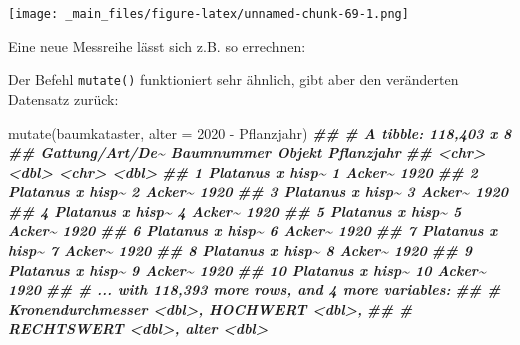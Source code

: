 \documentclass[11pt,german,a4paper]{article}
\newenvironment{Shaded}{\begin{snugshade}}{\end{snugshade}}
\newcommand{\AttributeTok}[1]{\textcolor[rgb]{0.77,0.63,0.00}{#1}}
\newcommand{\DecValTok}[1]{\textcolor[rgb]{0.00,0.00,0.81}{#1}}
\newcommand{\DocumentationTok}[1]{\textcolor[rgb]{0.56,0.35,0.01}{\textbf{\textit{#1}}}}
\newcommand{\FunctionTok}[1]{\textcolor[rgb]{0.00,0.00,0.00}{#1}}
\newcommand{\NormalTok}[1]{#1}
\newcommand{\OtherTok}[1]{\textcolor[rgb]{0.56,0.35,0.01}{#1}}
\newcommand{\SpecialCharTok}[1]{\textcolor[rgb]{0.00,0.00,0.00}{#1}}
\begin{document}
\texttt{[image: \_main\_files/figure-latex/unnamed-chunk-69-1.png]}

Eine neue Messreihe lässt sich z.B. so errechnen:

\begin{Shaded}
\end{Shaded}

Der Befehl \texttt{mutate()} funktioniert sehr ähnlich, gibt aber den veränderten Datensatz zurück:

\begin{Shaded}
\begin{Highlighting}[]
\FunctionTok{mutate}\NormalTok{(baumkataster, }\AttributeTok{alter =} \DecValTok{2020} \SpecialCharTok{{-}}\NormalTok{ Pflanzjahr)}
\DocumentationTok{\#\# \# A tibble: 118,403 x 8}
\DocumentationTok{\#\#    \textasciigrave{}Gattung/Art/De\textasciitilde{} Baumnummer Objekt Pflanzjahr}
\DocumentationTok{\#\#    \textless{}chr\textgreater{}                 \textless{}dbl\textgreater{} \textless{}chr\textgreater{}       \textless{}dbl\textgreater{}}
\DocumentationTok{\#\#  1 Platanus x hisp\textasciitilde{}          1 Acker\textasciitilde{}       1920}
\DocumentationTok{\#\#  2 Platanus x hisp\textasciitilde{}          2 Acker\textasciitilde{}       1920}
\DocumentationTok{\#\#  3 Platanus x hisp\textasciitilde{}          3 Acker\textasciitilde{}       1920}
\DocumentationTok{\#\#  4 Platanus x hisp\textasciitilde{}          4 Acker\textasciitilde{}       1920}
\DocumentationTok{\#\#  5 Platanus x hisp\textasciitilde{}          5 Acker\textasciitilde{}       1920}
\DocumentationTok{\#\#  6 Platanus x hisp\textasciitilde{}          6 Acker\textasciitilde{}       1920}
\DocumentationTok{\#\#  7 Platanus x hisp\textasciitilde{}          7 Acker\textasciitilde{}       1920}
\DocumentationTok{\#\#  8 Platanus x hisp\textasciitilde{}          8 Acker\textasciitilde{}       1920}
\DocumentationTok{\#\#  9 Platanus x hisp\textasciitilde{}          9 Acker\textasciitilde{}       1920}
\DocumentationTok{\#\# 10 Platanus x hisp\textasciitilde{}         10 Acker\textasciitilde{}       1920}
\DocumentationTok{\#\# \# ... with 118,393 more rows, and 4 more variables:}
\DocumentationTok{\#\# \#   Kronendurchmesser \textless{}dbl\textgreater{}, HOCHWERT \textless{}dbl\textgreater{},}
\DocumentationTok{\#\# \#   RECHTSWERT \textless{}dbl\textgreater{}, alter \textless{}dbl\textgreater{}}
\end{Highlighting}
\end{Shaded}
\end{document}

